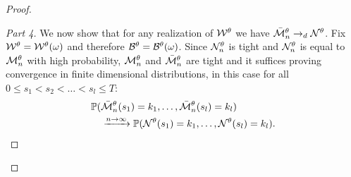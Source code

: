 \begin{proof}
\begin{proof}[Part 4]\renewcommand{\qedsymbol}{}
We now show that for any realization of $\mathcal{W}^{\theta}$ we have $\bar{\mathcal{M}}_n^{\theta} \rightarrow_d \mathcal{N}^{\theta}$.
Fix $\mathcal{W}^{\theta} = \mathcal{W}^{\theta}(\omega)$ and therefore $\mathcal{B}^{\theta} = \mathcal{B}^{\theta}(\omega)$.
Since $\mathcal{N}_n^{\theta}$ is tight and $\mathcal{N}_n^{\theta}$ is equal to $\mathcal{M}_n^{\theta}$ with high probability,
$\mathcal{M}_n^{\theta}$ and $\bar{\mathcal{M}}_n^{\theta}$ are tight and it suffices proving convergence in finite dimensional distributions,
in this case for all $0 \leq s_1 < s_2 < \dots < s_l \leq T$:
\begin{equation} \label{E: convergence fdd}
\begin{aligned}
&\mathbb{P}( \bar{\mathcal{M}}_n^{\theta}(s_1) = k_1, \dots, \bar{\mathcal{M}}_n^{\theta}(s_l) = k_l ) \\
&\quad \xrightarrow{n \rightarrow \infty}  \mathbb{P}( \mathcal{N}^{\theta}(s_1) = k_1, \dots, \mathcal{N}^{\theta}(s_l) = k_l ).
\end{aligned}
\end{equation}


\end{proof}
\end{proof}

